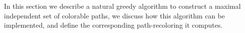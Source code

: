 \label{sec:greedy}

In this section we describe a natural greedy algorithm to construct a maximal
independent set of colorable paths, 
we discuss how this algorithm can be implemented,
and define the corresponding path-recoloring it computes.
